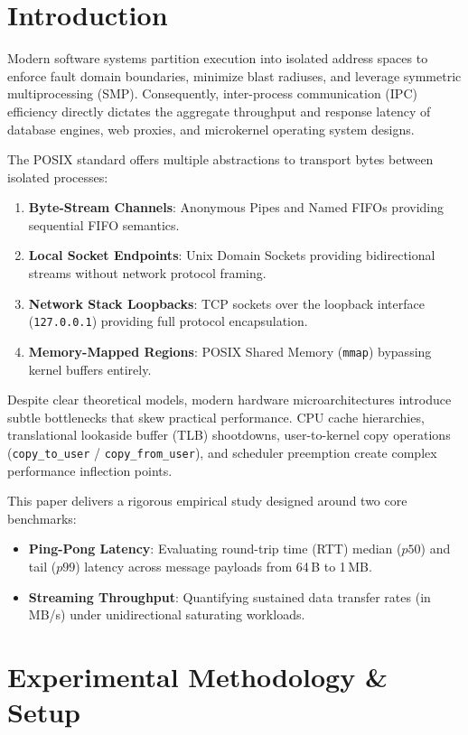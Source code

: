 \documentclass[conference]{IEEEtran}
\begin{document}
\section{Introduction}
Modern software systems partition execution into isolated address spaces to enforce fault domain boundaries, minimize blast radiuses, and leverage symmetric multiprocessing (SMP). Consequently, inter-process communication (IPC) efficiency directly dictates the aggregate throughput and response latency of database engines, web proxies, and microkernel operating system designs.

The POSIX standard offers multiple abstractions to transport bytes between isolated processes:
\begin{enumerate}
    \item \textbf{Byte-Stream Channels}: Anonymous Pipes and Named FIFOs providing sequential FIFO semantics.
    \item \textbf{Local Socket Endpoints}: Unix Domain Sockets providing bidirectional streams without network protocol framing.
    \item \textbf{Network Stack Loopbacks}: TCP sockets over the loopback interface (\texttt{127.0.0.1}) providing full protocol encapsulation.
    \item \textbf{Memory-Mapped Regions}: POSIX Shared Memory (\texttt{mmap}) bypassing kernel buffers entirely.
\end{enumerate}

Despite clear theoretical models, modern hardware microarchitectures introduce subtle bottlenecks that skew practical performance. CPU cache hierarchies, translational lookaside buffer (TLB) shootdowns, user-to-kernel copy operations (\texttt{copy\_to\_user} / \texttt{copy\_from\_user}), and scheduler preemption create complex performance inflection points.

This paper delivers a rigorous empirical study designed around two core benchmarks:
\begin{itemize}
    \item \textbf{Ping-Pong Latency}: Evaluating round-trip time (RTT) median ($p50$) and tail ($p99$) latency across message payloads from 64\,B to 1\,MB.
    \item \textbf{Streaming Throughput}: Quantifying sustained data transfer rates (in MB/s) under unidirectional saturating workloads.
\end{itemize}

\section{Experimental Methodology \& Setup}
\end{document}

